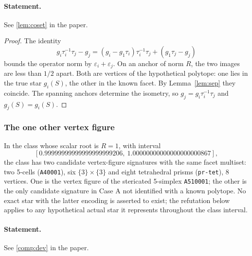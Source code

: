 \documentclass[11pt]{article}
\theoremstyle{definition}
\theoremstyle{remark}
\begin{document}
\paragraph{Statement.} See \ref{lem:coset} in the paper.

\begin{proof}
The identity
\[
g_i\tau_i^{-1}\tau_j-g_j
=(g_i-g_1\tau_i)\tau_i^{-1}\tau_j+(g_1\tau_j-g_j)
\]
bounds the operator norm by $\varepsilon_i+\varepsilon_j$.
On an anchor of norm $R$, the two images are less than $1/2$ apart.
Both are vertices of the hypothetical polytope: one lies in the true
star $g_i(S)$, the other in the known facet. By Lemma~\ref{lem:sep}
they coincide. The spanning anchors determine the isometry, so
$g_j=g_i\tau_i^{-1}\tau_j$ and $g_j(S)=g_i(S)$.
\end{proof}

\subsubsection{The one other vertex figure}\label{sec:extra}


In the class whose scalar root is $R=1$, with interval
\[[0.99999999999999999999206,\ 1.00000000000000000000867],\]
the class has
two candidate vertex-figure signatures with the same facet multiset: two 5-cells
(\texttt{A40001}), six $\{3\}\times\{3\}$ and eight tetrahedral prisms
(\texttt{pr-tet}), 8 vertices. One is the vertex figure of the stericated
5-simplex \texttt{A510001}; the other is the only candidate signature in
Case A not identified with a known polytope. No exact star with the latter encoding is asserted to
exist; the refutation below applies to any hypothetical actual star it
represents throughout the class interval.

\setcounter{theorem}{11}
\paragraph{Statement.} See \ref{comp:dev} in the paper.
\end{document}
